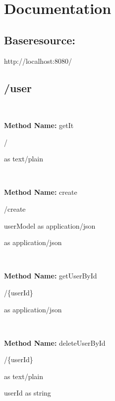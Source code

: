 \chapter{Documentation}

\section{Baseresource: }
http://localhost:8080/

\section{/user}

\

\textbf{Method Name: }getIt
\begin{get}
/
\end{get}

\begin{response}
 as text/plain
\end{response}

\

\textbf{Method Name: }create
\begin{post}
/create
\end{post}

\begin{request}
userModel as application/json
\end{request}

\begin{response}
 as application/json
\end{response}

\

\textbf{Method Name: }getUserById
\begin{get}
/\{userId\}
\end{get}

\begin{response}
 as application/json
\end{response}

\

\textbf{Method Name: }deleteUserById
\begin{delete}
/\{userId\}
\end{delete}

\begin{response}
 as text/plain
\end{response}

\begin{parameter}
userId as string
\end{parameter}

